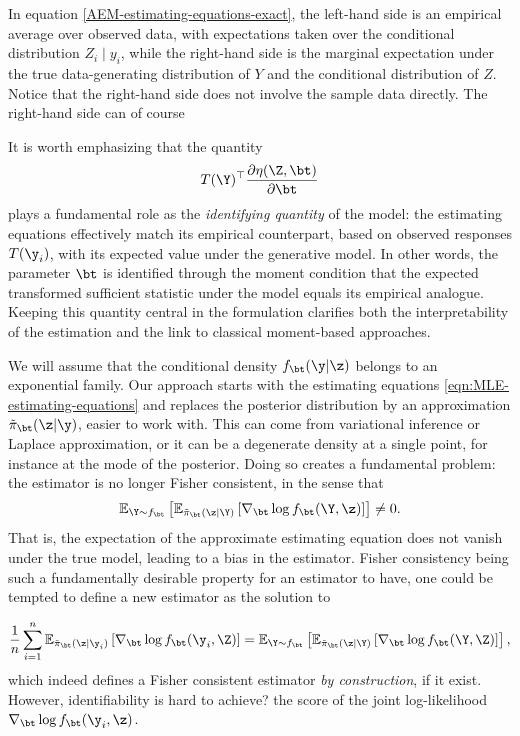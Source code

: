 In equation \eqref{AEM-estimating-equations-exact}, the left-hand side is an empirical average over observed data, with expectations taken over the conditional distribution \(Z_i \mid y_i\), while the right-hand side is the marginal expectation under the true data-generating distribution of \(Y\) and the conditional distribution of \(Z\). Notice that the right-hand side does not involve the sample data directly.  The right-hand side can of course 


\noindent
It is worth emphasizing that the quantity
\[
T(\Y)^\top \frac{\partial \eta(\Z, \bt)}{\partial \bt}
\]
plays a fundamental role as the \emph{identifying quantity} of the model: the estimating equations effectively match its empirical counterpart, based on observed responses $T(\y_i)$, with its expected value under the generative model. In other words, the parameter $\bt$ is identified through the moment condition that the expected transformed sufficient statistic under the model equals its empirical analogue. Keeping this quantity central in the formulation clarifies both the interpretability of the estimation and the link to classical moment-based approaches.



We will assume that the conditional density $f_\bt(\y|\z)$ belongs to an exponential family. 
Our approach starts with the estimating equations \eqref{eqn:MLE-estimating-equations} and replaces the posterior distribution by an approximation $\tilde\pi_\bt(\z|\y)$, easier to work with. This can come from variational inference or Laplace approximation, or it can be a degenerate density at a single point, for instance at the mode of the posterior. Doing so creates a fundamental problem: the estimator is no longer Fisher consistent, in the sense that
%
\begin{equation}
    \mathbb{E}_{\Y \sim f_\bt} \left[ \mathbb{E}_{\tilde\pi_\bt(\z \mid \Y)} \left[ \nabla_\bt \log f_\bt(\Y, \z) \right] \right] \neq 0.
\end{equation}
%
That is, the expectation of the approximate estimating equation does not vanish under the true model, leading to a bias in the estimator. Fisher consistency being such a fundamentally desirable property for an estimator to have, one could be tempted to define a new estimator as the solution to

\begin{equation}
\label{eqn:estimator-with-score-of-joint}
    \frac{1}{n}\sum_{i=1}^n \mathbb{E}_{\tilde\pi_\bt(\z \mid \y_i)} \left[ \nabla_\bt \log f_\bt(\y_i, \Z) \right] = 
    \mathbb{E}_{\Y \sim f_\bt} \left[ \mathbb{E}_{\tilde\pi_\bt(\z \mid \Y)} \left[ \nabla_\bt \log f_\bt(\Y, \Z) \right] \right],
\end{equation}
%
which indeed defines a Fisher consistent estimator \textit{by construction}, if it exist. However, identifiability is hard to achieve? the score of the joint log-likelihood $\nabla_\bt \log f_\bt(\y_i, \z)$. 


